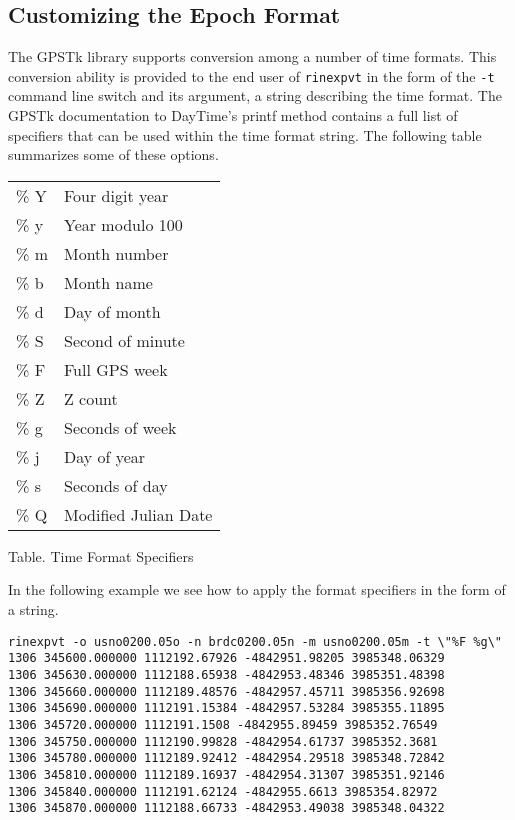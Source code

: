 \subsection{Customizing the Epoch Format}

The GPSTk library supports conversion among a number of time formats. This
conversion ability is provided to the end user of \texttt{rinexpvt} in the
form of the \texttt{-t} command line switch and its argument, a string
describing the time format. The GPSTk documentation to DayTime's printf method
contains a full list of specifiers that can be used within the time format
string. The following table summarizes some of these options.



\begin{center}
  \begin{tabular}{ll}
    \% Y & Four digit year\\
    \% y & Year modulo 100\\
    \% m & Month number\\
    \% b & Month name\\
    \% d & Day of month\\
    \% S & Second of minute\\
    \% F & Full GPS week\\
    \% Z & Z count\\
    \% g & Seconds of week\\
    \% j & Day of year\\
    \% s & Seconds of day\\
    \% Q & Modified Julian Date
  \end{tabular}
\end{center}

\begin{center}
  Table. Time Format Specifiers
\end{center}



In the following example we see how to apply the format specifiers in the form
of a string.

\small
\begin{singlespace}
\begin{verbatim}
rinexpvt -o usno0200.05o -n brdc0200.05n -m usno0200.05m -t \"%F %g\" 
1306 345600.000000 1112192.67926 -4842951.98205 3985348.06329
1306 345630.000000 1112188.65938 -4842953.48346 3985351.48398
1306 345660.000000 1112189.48576 -4842957.45711 3985356.92698
1306 345690.000000 1112191.15384 -4842957.53284 3985355.11895
1306 345720.000000 1112191.1508 -4842955.89459 3985352.76549
1306 345750.000000 1112190.99828 -4842954.61737 3985352.3681
1306 345780.000000 1112189.92412 -4842954.29518 3985348.72842
1306 345810.000000 1112189.16937 -4842954.31307 3985351.92146
1306 345840.000000 1112191.62124 -4842955.6613 3985354.82972
1306 345870.000000 1112188.66733 -4842953.49038 3985348.04322
\end{verbatim}
\end{singlespace}
\normalsize


